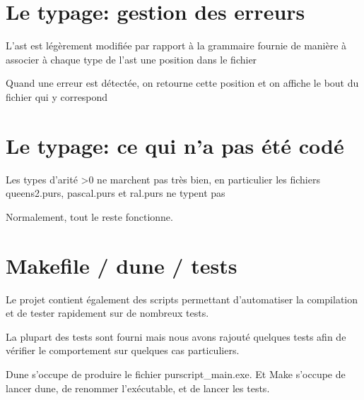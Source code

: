 \documentclass[12pt,a4paper,french]{article}
\begin{document}
\part*{Le typage: gestion des erreurs}

L'ast est légèrement modifiée par rapport à la grammaire fournie de manière à associer à chaque type de l'ast une position dans le fichier

Quand une erreur est détectée, on retourne cette position et on affiche le bout du fichier qui y correspond


\part*{Le typage: ce qui n'a pas été codé}

Les types d'arité >0 ne marchent pas très bien, en particulier les fichiers queens2.purs, pascal.purs et ral.purs ne typent pas

Normalement, tout le reste fonctionne.



\part*{Makefile / dune / tests}
Le projet contient également des scripts permettant d'automatiser la compilation et de tester rapidement sur de nombreux tests.

La plupart des tests sont fourni mais nous avons rajouté quelques tests afin de vérifier le comportement sur quelques cas particuliers.

Dune s'occupe de produire le fichier purscript\_main.exe. Et Make s'occupe de lancer dune, de renommer l'exécutable, et de lancer les tests.
\end{document}
